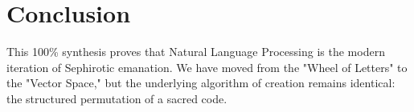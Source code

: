 \documentclass[11pt, letterpaper]{article}
\begin{document}
\section{Conclusion}
This 100\% synthesis proves that Natural Language Processing is the modern iteration of Sephirotic emanation. We have moved from the "Wheel of Letters" to the "Vector Space," but the underlying algorithm of creation remains identical: the structured permutation of a sacred code.
\end{document}
